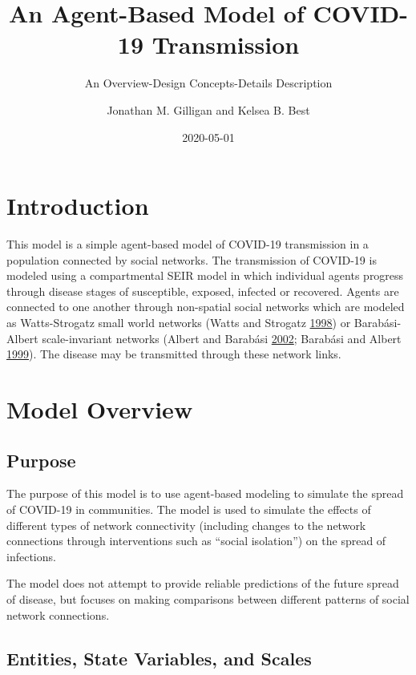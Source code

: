 \documentclass[
]{article}
\title{An Agent-Based Model of COVID-19 Transmission}
\subtitle{An Overview-Design Concepts-Details Description}
\author{Jonathan M. Gilligan and Kelsea B. Best}
\date{2020-05-01}
\begin{document}
\maketitle

{
\setcounter{tocdepth}{2}
\tableofcontents
}
\hypertarget{introduction}{%
\section{Introduction}\label{introduction}}

This model is a simple agent-based model of COVID-19 transmission in a
population connected by social networks. The transmission of COVID-19 is
modeled using a compartmental SEIR model in which individual agents
progress through disease stages of susceptible, exposed, infected or
recovered. Agents are connected to one another through non-spatial
social networks which are modeled as Watts-Strogatz small world networks
(Watts and Strogatz
\protect\hyperlink{ref-watts:collective.dynamics:1998}{1998}) or
Barabási-Albert scale-invariant networks (Albert and Barabási
\protect\hyperlink{ref-albert:statistical.mechanics:2002}{2002};
Barabási and Albert
\protect\hyperlink{ref-barabasi:emergence.scaling:1999}{1999}). The
disease may be transmitted through these network links.

\hypertarget{model-overview}{%
\section{Model Overview}\label{model-overview}}

\hypertarget{purpose}{%
\subsection{Purpose}\label{purpose}}

The purpose of this model is to use agent-based modeling to simulate the
spread of COVID-19 in communities. The model is used to simulate the
effects of different types of network connectivity (including changes to
the network connections through interventions such as ``social
isolation'') on the spread of infections.

The model does not attempt to provide reliable predictions of the future
spread of disease, but focuses on making comparisons between different
patterns of social network connections.

\hypertarget{entities-state-variables-and-scales}{%
\subsection{Entities, State Variables, and
Scales}\label{entities-state-variables-and-scales}}
\end{document}
